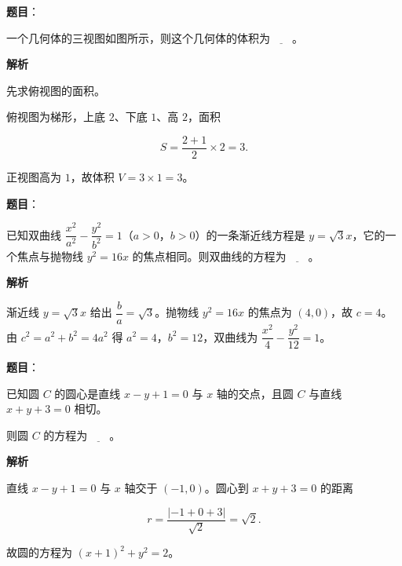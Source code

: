 \begin{answer}

\textbf{题目}：

一个几何体的三视图如图所示，则这个几何体的体积为$\underline{\qquad}$。
\nopagebreak[4]
\begin{center}\end{center}
\nopagebreak[4]
\textbf{解析}

先求俯视图的面积。

俯视图为梯形，上底 $2$、下底 $1$、高 $2$，面积

\nopagebreak[4]
\[S=\frac{2+1}2\times2=3.\]

正视图高为 $1$，故体积 $V=3\times1=3$。


\end{answer}
\begin{answer}

\textbf{题目}：

已知双曲线 $\dfrac{x^2}{a^2}-\dfrac{y^2}{b^2}=1$（$a>0$，$b>0$）的一条渐近线方程是 $y=\sqrt3x$，它的一个焦点与抛物线 $y^2=16x$ 的焦点相同。则双曲线的方程为$\underline{\qquad}$。

\textbf{解析}

渐近线 $y=\sqrt3x$ 给出 $\dfrac ba=\sqrt3$。抛物线 $y^2=16x$ 的焦点为 $(4,0)$，故 $c=4$。由 $c^2=a^2+b^2=4a^2$ 得 $a^2=4$，$b^2=12$，双曲线为 $\dfrac{x^2}4-\dfrac{y^2}{12}=1$。


\end{answer}
\begin{answer}

\textbf{题目}：

已知圆 $C$ 的圆心是直线 $x-y+1=0$ 与 $x$ 轴的交点，且圆 $C$ 与直线 $x+y+3=0$ 相切。

则圆 $C$ 的方程为$\underline{\qquad}$。

\textbf{解析}

直线 $x-y+1=0$ 与 $x$ 轴交于 $(-1,0)$。圆心到 $x+y+3=0$ 的距离

\nopagebreak[4]
\[r=\frac{|-1+0+3|}{\sqrt2}=\sqrt2.\]

故圆的方程为 $(x+1)^2+y^2=2$。


\end{answer}
